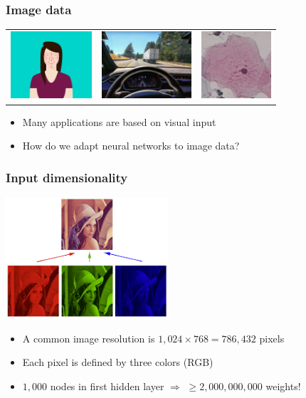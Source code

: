 \documentclass[10pt]{beamer}
\begin{document}
\begin{frame}
\frametitle{Image data}
\begin{center}
\begin{tabular}{ccc}
\includegraphics[height=2.5cm]{images/Face_Recognition.png}
& \includegraphics[height=2.5cm]{images/Tesla.jpg}
& \includegraphics[height=2.5cm]{images/img1.png}
\end{tabular}
\end{center}
\begin{itemize}
\item Many applications are based on visual input
\item How do we adapt neural networks to image data?
\end{itemize}
\end{frame}

\begin{frame}
\frametitle{Input dimensionality}
\begin{center}
\includegraphics[height=4.5cm]{images/rgb.png}
\end{center}
\begin{itemize}
\item A common image resolution is $1{,}024 \times 768 = 786{,}432$ pixels
\item Each pixel is defined by three colors ({\color{red}R}{\color{green}G}{\color{blue}B})
\item $1{,}000$ nodes in first hidden layer $\Rightarrow$ {\color{red} $\geq 2{,}000{,}000{,}000$ weights!}
\end{itemize}
\end{frame}
\end{document}
